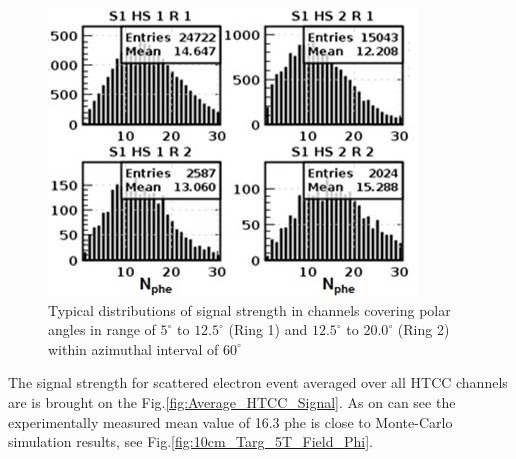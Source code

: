 \begin{figure}[!h]
    \centering
    \includegraphics[width=1.0\linewidth,trim={0.0cm 0.0cm 0.0cm 0.0cm},clip]{images/Signal_S1_HS1_HS2_R1_R2.jpg}
    \caption{Typical distributions of signal strength in channels covering polar angles in range of $5^\circ$ to $12.5^\circ$ (Ring 1) and $12.5^\circ$ to $20.0^\circ$ (Ring 2) within azimuthal interval of $60^\circ$}
    \label{fig:Signal_S1_HS1_HS2_R1_R2}
\end{figure}
The signal strength for scattered electron event averaged over all HTCC channels are is brought on the Fig.\ref{fig:Average_HTCC_Signal}. As on can see the experimentally measured mean value of 16.3 phe is close to Monte-Carlo simulation results, see Fig.\ref{fig:10cm_Targ_5T_Field_Phi}.

